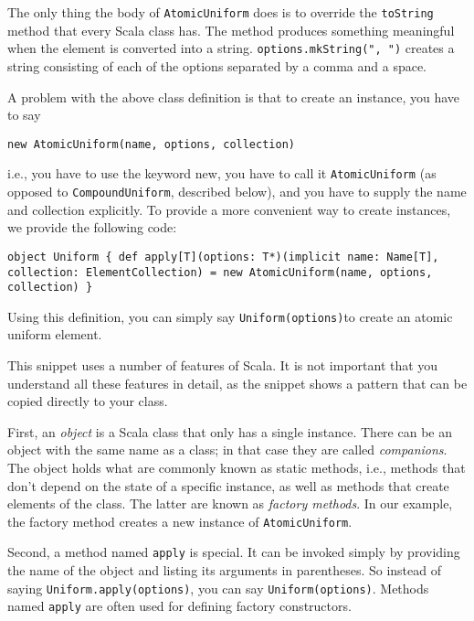 The only thing the body of  \texttt{AtomicUniform} does is to override the \texttt{toString} method that every Scala class has. The method produces something meaningful when the element is converted into a string. \texttt{options.mkString(", ")} creates a string consisting of each of the options separated by a comma and a space.

A problem with the above class definition is that to create an instance, you have to say

\begin{flushleft}
\texttt{new AtomicUniform(name, options, collection)}
\end{flushleft}

i.e., you have to use the keyword new, you have to call it \texttt{AtomicUni\-form} (as opposed to \texttt{CompoundUniform}, described below), and you have to supply the name and collection explicitly. To provide a more convenient way to create instances, we provide the following code:

\begin{flushleft}
\texttt{object \texttt{Uniform} \{
\newline \tab def apply[T](options: T*)(implicit name: Name[T], collection:
\newline \tab ElementCollection) =
\newline \tab new AtomicUniform(name, options, collection)
\}
}
\end{flushleft}

Using this definition, you can simply say \texttt{Uniform(options)}to create an atomic uniform element.

This snippet uses a number of features of Scala. It is not important that you understand all these features in detail, as the snippet shows a pattern that can be copied directly to your class.

First, an \emph{object} is a Scala class that only has a single instance. There can be an object with the same name as a class; in that case they are called \emph{companions}. The object holds what are commonly known as static methods, i.e., methods that don't depend on the state of a specific instance, as well as methods that create elements of the class. The latter are known as \emph{factory methods}. In our example, the factory method creates a new instance of \texttt{AtomicUniform}.

Second, a method named \texttt{apply} is special. It can be invoked simply by providing the name of the object and listing its arguments in parentheses. So instead of saying \texttt{Uniform.apply(options)}, you can say \texttt{Uniform(options)}. Methods named \texttt{apply} are often used for defining factory constructors.

